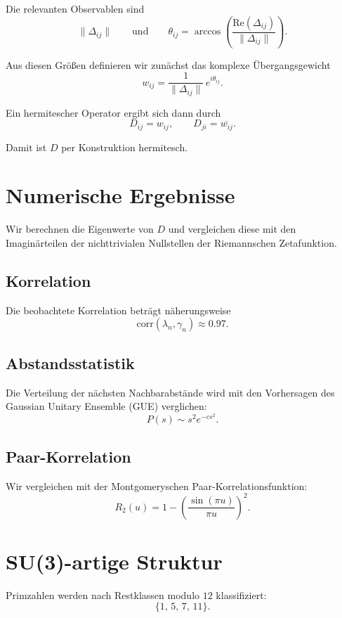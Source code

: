 \documentclass[11pt,a4paper]{article}
\begin{document}
	Die relevanten Observablen sind
	\[
	\|\Delta_{ij}\|
	\qquad \text{und} \qquad
	\theta_{ij}
	=
	\arccos\!\left(
	\frac{\mathrm{Re}(\Delta_{ij})}{\|\Delta_{ij}\|}
	\right).
	\]
	
	Aus diesen Größen definieren wir zunächst das komplexe Übergangsgewicht
	\[
	w_{ij}
	=
	\frac{1}{\|\Delta_{ij}\|}\, e^{i\theta_{ij}}.
	\]
	
	Ein hermitescher Operator ergibt sich dann durch
	\[
	D_{ij} = w_{ij}, \qquad D_{ji} = \overline{w_{ij}}.
	\]
	
	Damit ist \(D\) per Konstruktion hermitesch.
	
	\section{Numerische Ergebnisse}
	
	Wir berechnen die Eigenwerte von \(D\) und vergleichen diese mit den
	Imaginärteilen der nichttrivialen Nullstellen der Riemannschen Zetafunktion.
	
	\subsection{Korrelation}
	
	Die beobachtete Korrelation beträgt näherungsweise
	\[
	\mathrm{corr}(\lambda_n,\gamma_n) \approx 0.97.
	\]
	
	\subsection{Abstandsstatistik}
	
	Die Verteilung der nächsten Nachbarabstände wird mit den Vorhersagen
	des Gaussian Unitary Ensemble (GUE) verglichen:
	\[
	P(s) \sim s^2 e^{-c s^2}.
	\]
	
	\subsection{Paar-Korrelation}
	
	Wir vergleichen mit der Montgomeryschen Paar-Korrelationsfunktion:
	\[
	R_2(u)
	=
	1-
	\left(
	\frac{\sin(\pi u)}{\pi u}
	\right)^2.
	\]
	
	\section{SU(3)-artige Struktur}
	
	Primzahlen werden nach Restklassen modulo \(12\) klassifiziert:
	\[
	\{1,\,5,\,7,\,11\}.
	\]
	
\end{document}
